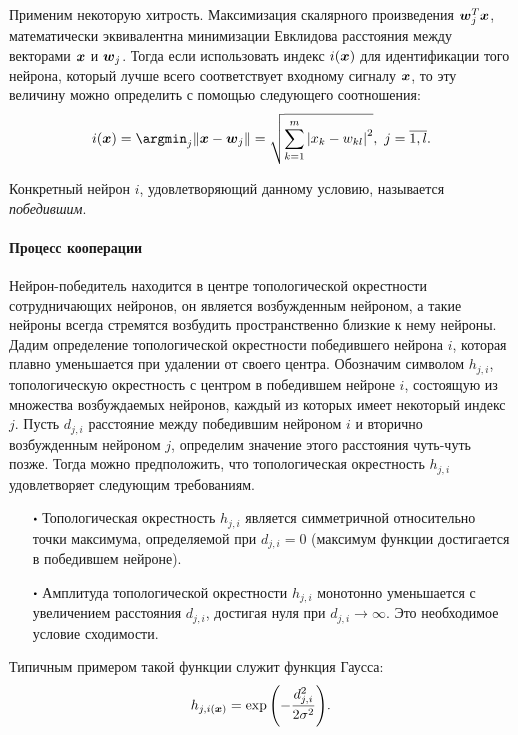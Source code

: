 \documentclass[a4paper,12pt]{report}
\begin{document}
Применим некоторую хитрость. Максимизация скалярного произведения
$\boldsymbol{w}_j^{T}\boldsymbol{x}$, математически эквивалентна минимизации Евклидова
расстояния между векторами $\boldsymbol{x}$ и $\boldsymbol{w}_j$. Тогда если
использовать индекс $i(\boldsymbol{x})$ для идентификации того нейрона, который
лучше всего соответствует входному сигналу $\boldsymbol{x}$, то эту величину
можно определить с помощью следующего соотношения:
\begin{equation}
    i(\bldx) = \argmin_{j}{\norm{\bldx - \bldw_j}} =
    \sqrt{\sum_{k=1}^{m}{\left|x_k-w_{kl}\right|^{2}}} ,\ j = \overline{1,l}.
\end{equation}

Конкретный нейрон $i$, удовлетворяющий данному условию, называется
\textit{победившим}.

\paragraph{Процесс кооперации}
Нейрон-победитель находится в центре топологической окрестности
сотрудничающих нейронов, он является возбужденным нейроном, а такие
нейроны всегда стремятся возбудить пространственно близкие к нему
нейроны. Дадим определение топологической окрестности победившего
нейрона $i$, которая плавно уменьшается при удалении от своего центра.
Обозначим символом $h_{j,i}$, топологическую окрестность с центром в
победившем нейроне $i$, состоящую из множества возбуждаемых нейронов,
каждый из которых имеет некоторый индекс $j$. Пусть $d_{j,i}$
расстояние между победившим нейроном $i$ и вторично возбужденным
нейроном $j$, определим значение этого расстояния чуть-чуть позже.
Тогда можно предположить, что топологическая окрестность
$h_{j,i}$ удовлетворяет следующим требованиям.
\begin{itemize}
    \item[$\bigcdot$] Топологическая окрестность $h_{j,i}$ является
        симметричной относительно точки максимума, определяемой при
        $d_{j,i} = 0$ (максимум функции достигается в победившем
        нейроне).
    \item[$\bigcdot$] Амплитуда топологической окрестности $h_{j,i}$
        монотонно уменьшается с увеличением расстояния $d_{j,i}$,
        достигая нуля при $d_{j,i} \to \infty$. Это необходимое
        условие сходимости.
\end{itemize}

Типичным примером такой функции служит функция Гаусса:
\begin{equation} \label{eq:Gauss Func}
    h_{j,i(\boldsymbol{x})}=\exp{\left(-\frac{d_{j,i}^{2}}{2\sigma^2}\right)}.
\end{equation}
\end{document}
